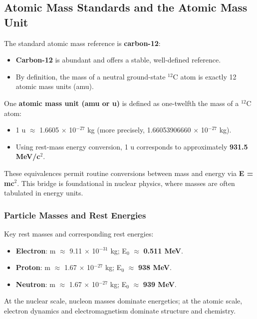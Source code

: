 \documentclass[11pt,a4paper]{article}
\let\originalsubsection\subsection
\renewcommand{\subsection}{\Needspace{8\baselineskip}\originalsubsection}
\begin{document}
\subsection{Atomic Mass Standards and the Atomic Mass Unit}
The standard atomic mass reference is \textbf{carbon-12}:

\begin{itemize}
\item \textbf{Carbon-12} is abundant and offers a stable, well-defined reference.
\item By definition, the mass of a neutral ground-state \ensuremath{{}^{12}}C atom is exactly 12 atomic mass units (amu).
\end{itemize}
One \textbf{atomic mass unit (amu or u)} is defined as one-twelfth the mass of a \ensuremath{{}^{12}}C atom:

\begin{itemize}
\item 1 u \ensuremath{\approx} 1.6605 \ensuremath{\times} 10\ensuremath{{}^{-27}} kg (more precisely, 1.66053906660 \ensuremath{\times} 10\ensuremath{{}^{-27}} kg).
\item Using rest-mass energy conversion, 1 u corresponds to approximately \textbf{931.5 MeV/c\ensuremath{{}^{2}}}.
\end{itemize}
These equivalences permit routine conversions between mass and energy via \textbf{E = mc\ensuremath{{}^{2}}}. This bridge is foundational in nuclear physics, where masses are often tabulated in energy units.

\subsubsection{Particle Masses and Rest Energies}
Key rest masses and corresponding rest energies:

\begin{itemize}
\item \textbf{Electron}: m \ensuremath{\approx} 9.11 \ensuremath{\times} 10\ensuremath{{}^{-31}} kg; E\ensuremath{{}_{0}} \ensuremath{\approx} \textbf{0.511 MeV}.
\item \textbf{Proton}: m \ensuremath{\approx} 1.67 \ensuremath{\times} 10\ensuremath{{}^{-27}} kg; E\ensuremath{{}_{0}} \ensuremath{\approx} \textbf{938 MeV}.
\item \textbf{Neutron}: m \ensuremath{\approx} 1.67 \ensuremath{\times} 10\ensuremath{{}^{-27}} kg; E\ensuremath{{}_{0}} \ensuremath{\approx} \textbf{939 MeV}.
\end{itemize}
At the nuclear scale, nucleon masses dominate energetics; at the atomic scale, electron dynamics and electromagnetism dominate structure and chemistry.
\end{document}
